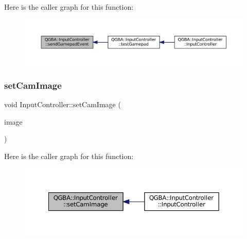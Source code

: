 Here is the caller graph for this function\+:
\nopagebreak
\begin{figure}[H]
\begin{center}
\leavevmode
\includegraphics[width=350pt]{class_q_g_b_a_1_1_input_controller_a56d481c42593a40d448bcfd2d385a392_icgraph}
\end{center}
\end{figure}
\mbox{\label{class_q_g_b_a_1_1_input_controller_a61728418639adc71f4ab08fa89720852}} 
\subsubsection{\texorpdfstring{set\+Cam\+Image}{setCamImage}}
{\footnotesize\ttfamily void Input\+Controller\+::set\+Cam\+Image (\begin{DoxyParamCaption}\item[{const Q\+Image \&}]{image }\end{DoxyParamCaption})\hspace{0.3cm}{\ttfamily [slot]}}

Here is the caller graph for this function\+:
\nopagebreak
\begin{figure}[H]
\begin{center}
\leavevmode
\includegraphics[width=350pt]{class_q_g_b_a_1_1_input_controller_a61728418639adc71f4ab08fa89720852_icgraph}
\end{center}
\end{figure}
\mbox{\label{class_q_g_b_a_1_1_input_controller_afea2c3e3f7d19b60ea6903b19b9630de}} 
